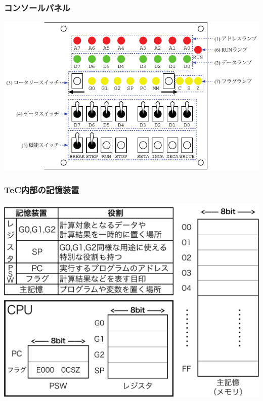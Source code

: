 \documentclass[handout]{beamer}         %
\begin{document}
\begin{frame}
  \frametitle{コンソールパネル}
  \vfill
  \centerline{\includegraphics[scale=1.0]{../chap4/console.pdf}}
  \vfill
\end{frame}

\begin{frame}
  \frametitle{TeC内部の記憶装置}
  \vfill
  \centerline{\includegraphics[scale=0.24]{../Keynote/naibu-crop.pdf}}
  \vfill
\end{frame}
\end{document}
